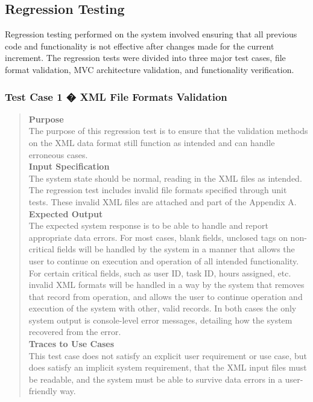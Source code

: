 \documentclass[12pt]{article}
\begin{document}
\subsection{Regression Testing}
{
Regression testing performed on the system involved ensuring that all previous code and functionality is not effective after changes made for the current increment. The regression tests were divided into three major test cases, file format validation, MVC architecture validation, and functionality verification.
}
\subsubsection{Test Case 1 � XML File Formats Validation}
\begin{quote}
{\bf Purpose}
\\
{
The purpose of this regression test is to ensure that the validation methods on the XML data format still function as intended and can handle erroneous cases.
}
\\
{\bf Input Specification}
\\
{
The system state should be normal, reading in the XML files as intended. The regression test includes invalid file formats specified through unit tests. These invalid XML files are attached and part of the Appendix A.
}
\\
{\bf Expected Output}
\\
{
The expected system response is to be able to handle and report appropriate data errors. For most cases, blank fields, unclosed tags on non-critical fields will be handled by the system in a manner that allows the user to continue on execution and operation of all intended functionality. For certain critical fields, such as user ID, task ID, hours assigned, etc. invalid XML formats will be handled in a way by the system that removes that record from operation, and allows the user to continue operation and execution of the system with other, valid records. In both cases the only system output is console-level error messages, detailing how the system recovered from the error.
}
\\
{\bf Traces to Use Cases}
\\
{
This test case does not satisfy an explicit user requirement or use case, but does satisfy an implicit system requirement, that the XML input files must be readable, and the system must be able to survive data errors in a user-friendly way.
}
\end{quote}
\end{document}
